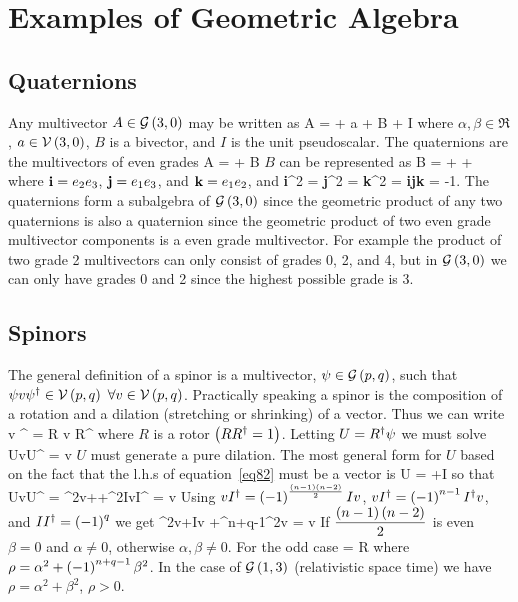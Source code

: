 \chapter{Examples of Geometric Algebra}
\section{Quaternions}
Any multivector $A \in \mathcal{G}\left ( {3,0} \right )$ may be written as
\be
A = \alpha + a + B + \beta I
\ee 
where $\alpha,\beta \in \Re$, $a \in \mathcal{V}\left ( 3,0 \right )$, $B$ is a bivector, and
$I$ is the unit pseudoscalar. The quaternions are the multivectors of even grades
\be
A = \alpha + B
\ee
$B$ can be represented as
\be
B = + + 
\ee
where ${\bf i} = e_{2}e_{3}$, ${\bf j} = e_{1}e_{3}$, and ${\bf k} = e_{1}e_{2}$, and
\be
{\bf i}^{2} = {\bf j}^{2} = {\bf k}^{2} = {\bf ijk} = -1.
\ee
The quaternions form a subalgebra of $\mathcal{G}\left ( {3,0} \right )$ since the geometric product of any
two quaternions is also a quaternion since the geometric product of two even grade
multivector components is a even grade multivector. For example the product of two
grade 2 multivectors can only consist of grades 0, 2, and 4, but in $\mathcal{G}\left ( {3,0} \right )$ we can only have grades 0 and 2 since the highest possible grade is 3.
\section{Spinors}
The general definition of a spinor is a multivector, $\psi \in \mathcal{G}\left ( {p,q} \right )$, such that
$\psi v \psi^{\dagger} \in \mathcal{V}\left ( {p,q} \right ) \ \forall v \in \mathcal{V}\left ( {p,q} \right )$. Practically speaking a spinor is the
composition of a rotation and a dilation (stretching or shrinking) of a vector.  Thus we can write
\be 
	\psi v \psi^{\R} = \rho R v R^{\R}
\ee
where $R$ is a rotor $\left ( {RR^{\dagger}=1} \right )$. Letting $U = R^{\dagger}\psi$ we must solve
\be\label{eq82}
	UvU^{\R} = \rho v
\ee
$U$ must generate a pure dilation.  The most general form for $U$ based on the fact that the l.h.s of 
equation~\ref{eq82} must be a vector is
\be
	U = \alpha+\beta I
\ee
so that
\be
UvU^{\R} = \alpha^{2}v+\alpha\beta{}+\beta^{2}IvI^{\R} = \rho v
\ee
Using $vI^{\dagger} = \left ( {-1} \right )^{\frac{\left ( {n-1} \right )\left ( {n-2} \right )}{2}}Iv$, $vI^{\dagger} = \left ( {-1} \right )^{n-1}I^{\dagger}v$,
and $II^{\dagger} = \left ( {-1} \right )^{q}$ we get
\be
	\alpha^{2}v+\alpha\beta{}Iv
	+^{n+q-1}\beta^{2}v = \rho v
\ee
If $\displaystyle\frac{\left ( {n-1} \right )\left ( {n-2} \right )}{2}$ is even $\beta = 0$ and $\alpha \ne 0$, otherwise $\alpha,\beta \ne 0$.
For the odd case 
\be
	\psi = R
\ee
where $\rho = \alpha^{2}+\left ( {-1} \right )^{n+q-1}\beta^{2}$. In the case of $\mathcal{G}\left ( {1,3} \right )$ (relativistic space time) we have 
$\rho = \alpha^{2}+\beta^{2}$, $\rho > 0$.
